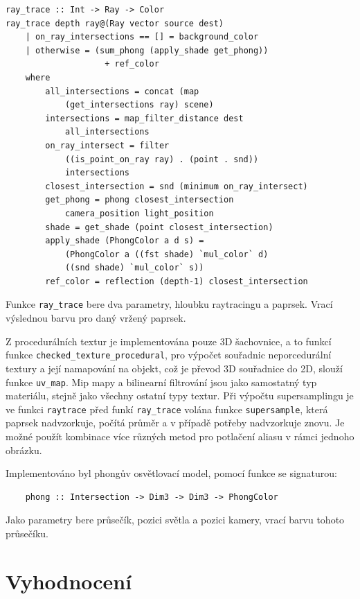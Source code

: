 \documentclass[a4paper, 12pt]{article}
\begin{document}
\begin{verbatim}
ray_trace :: Int -> Ray -> Color 
ray_trace depth ray@(Ray vector source dest)  
    | on_ray_intersections == [] = background_color
    | otherwise = (sum_phong (apply_shade get_phong)) 
                    + ref_color 
    where
        all_intersections = concat (map 
            (get_intersections ray) scene)
        intersections = map_filter_distance dest 
            all_intersections
        on_ray_intersect = filter 
            ((is_point_on_ray ray) . (point . snd)) 
            intersections
        closest_intersection = snd (minimum on_ray_intersect) 
        get_phong = phong closest_intersection 
            camera_position light_position
        shade = get_shade (point closest_intersection)
        apply_shade (PhongColor a d s) = 
            (PhongColor a ((fst shade) `mul_color` d) 
            ((snd shade) `mul_color` s))
        ref_color = reflection (depth-1) closest_intersection
\end{verbatim}

Funkce \texttt{ray\_trace} bere dva parametry, hloubku raytracingu a paprsek. Vrací výslednou barvu pro daný vržený paprsek.

Z procedurálních textur je implementována pouze 3D šachovnice, a to funkcí funkce \texttt{checked\_texture\_procedural}, pro výpočet souřadnic neporcedurální textury a její namapování na objekt,
což je převod 3D souřadnice do 2D, slouží funkce \texttt{uv\_map}. Mip mapy a bilinearní filtrování jsou jako samostatný typ materiálu, stejně jako všechny
ostatní typy textur. Při výpočtu supersamplingu je ve funkci \texttt{raytrace} před funkí \texttt{ray\_trace}
volána funkce \texttt{supersample}, která paprsek nadvzorkuje, počítá průměr a v případě potřeby nadvzorkuje znovu. Je možné použít kombinace
více různých metod pro potlačení aliasu v rámci jednoho obrázku.

Implementováno byl phongův osvětlovací model, pomocí funkce se signaturou: 
\begin{verbatim}
    phong :: Intersection -> Dim3 -> Dim3 -> PhongColor 
\end{verbatim}
Jako parametry bere průsečík, pozici světla a pozici kamery, vrací barvu tohoto průsečíku.


\section{Vyhodnocení}
\end{document}
